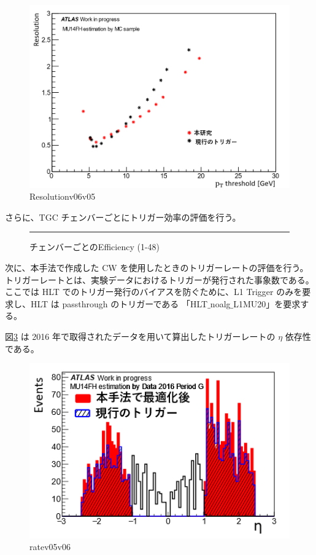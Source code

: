 \begin{figure}[tb]
  \centering
  \includegraphics[clip, width=12cm]{fig/4/resolution_v07_v05.png}
  \caption{Resolutionv06v05}
  \label{fig:Resolution_v06v05}
\end{figure}

さらに、TGC チェンバーごとにトリガー効率の評価を行う。
\begin{figure}[tb]
  \centering
  \rule{8cm}{6cm}
  \caption{チェンバーごとのEfficiency (1-48)}
  \label{fig:fit_def}
\end{figure}

次に、本手法で作成した CW を使用したときのトリガーレートの評価を行う。トリガーレートとは、実験データにおけるトリガーが発行された事象数である。ここでは HLT でのトリガー発行のバイアスを防ぐために、L1 Trigger のみを要求し、HLT は passthrough のトリガーである 「HLT$\_$noalg$\_$L1MU20」を要求する。

図\ref{fig:Ratev05v06} は 2016 年で取得されたデータを用いて算出したトリガーレートの $\eta$ 依存性である。

\begin{figure}[tb]
  \centering
  \includegraphics[clip, width=12cm]{fig/4/rate_v05_v06.png}
  \caption{ratev05v06}
  \label{fig:Ratev05v06}
\end{figure}

